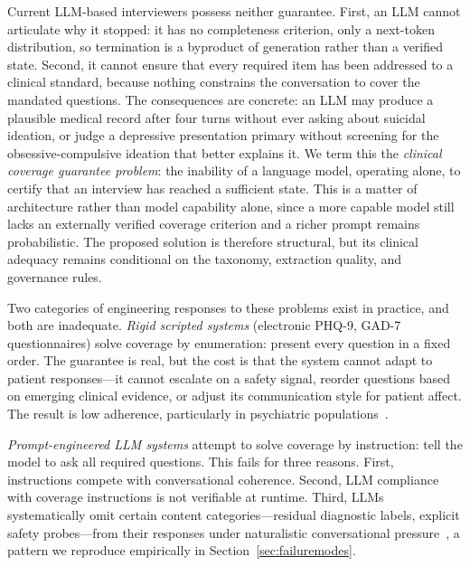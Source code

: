 \documentclass[conference]{IEEEtran}
\begin{document}
Current LLM-based interviewers possess neither guarantee. First, an LLM
cannot articulate why it stopped: it has no completeness
criterion, only a next-token distribution, so termination is a
byproduct of generation rather than a verified state. Second, it cannot
ensure that every required item has been addressed to a clinical
standard, because nothing constrains the conversation to cover the
mandated questions. The consequences are concrete: an LLM may produce a
plausible medical record after four turns without ever asking about
suicidal ideation, or judge a depressive presentation primary without
screening for the obsessive-compulsive ideation that better explains
it.  We term this the \emph{clinical coverage guarantee problem}: the
inability of a language model, operating alone, to certify that an
interview has reached a sufficient state. This is a matter of
architecture rather than model capability alone, since a more capable
model still lacks an externally verified coverage criterion and a
richer prompt remains probabilistic. The proposed solution is therefore
structural, but its clinical adequacy remains conditional on the
taxonomy, extraction quality, and governance rules.

Two categories of engineering responses to these problems exist in practice, and both are inadequate. \textit{Rigid scripted systems} (electronic PHQ-9, GAD-7 questionnaires) solve coverage by enumeration: present every question in a fixed order. The guarantee is real, but the cost is that the system cannot adapt to patient responses---it cannot escalate on a safety signal, reorder questions based on emerging clinical evidence, or adjust its communication style for patient affect. The result is low adherence, particularly in psychiatric populations~\cite{torous2020dropout}.

\textit{Prompt-engineered LLM systems} attempt to solve coverage by instruction: tell the model to ask all required questions. This fails for three reasons. First, instructions compete with conversational coherence. Second, LLM compliance with coverage instructions is not verifiable at runtime. Third, LLMs systematically omit certain content categories---residual diagnostic labels, explicit safety probes---from their responses under naturalistic conversational pressure~\cite{ni2026disentangling}, a pattern we reproduce empirically in Section~\ref{sec:failuremodes}.
\end{document}
